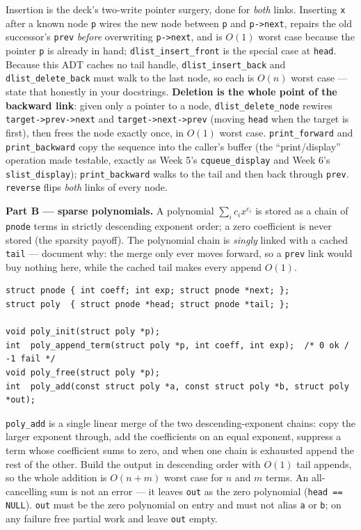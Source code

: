 \documentclass[11pt]{article}
\begin{document}
Insertion is the deck's two-write pointer surgery, done for \emph{both} links. Inserting \texttt{x} after a known node \texttt{p} wires the new node between \texttt{p} and \texttt{p->next}, repairs the old successor's \texttt{prev} \emph{before} overwriting \texttt{p->next}, and is $O(1)$ worst case because the pointer \texttt{p} is already in hand; \texttt{dlist\_insert\_front} is the special case at \texttt{head}. Because this ADT caches no tail handle, \texttt{dlist\_insert\_back} and \texttt{dlist\_delete\_back} must walk to the last node, so each is $O(n)$ worst case --- state that honestly in your docstrings. \textbf{Deletion is the whole point of the backward link}: given only a pointer to a node, \texttt{dlist\_delete\_node} rewires \texttt{target->prev->next} and \texttt{target->next->prev} (moving \texttt{head} when the target is first), then frees the node exactly once, in $O(1)$ worst case. \texttt{print\_forward} and \texttt{print\_backward} copy the sequence into the caller's buffer (the ``print/display'' operation made testable, exactly as Week 5's \texttt{cqueue\_display} and Week 6's \texttt{slist\_display}); \texttt{print\_backward} walks to the tail and then back through \texttt{prev}. \texttt{reverse} flips \emph{both} links of every node.

\textbf{Part B --- sparse polynomials.} A polynomial $\sum_i c_i x^{e_i}$ is stored as a chain of \texttt{pnode} terms in strictly descending exponent order; a zero coefficient is never stored (the sparsity payoff). The polynomial chain is \emph{singly} linked with a cached \texttt{tail} --- document why: the merge only ever moves forward, so a \texttt{prev} link would buy nothing here, while the cached tail makes every append $O(1)$.
\begin{verbatim}
struct pnode { int coeff; int exp; struct pnode *next; };
struct poly  { struct pnode *head; struct pnode *tail; };

void poly_init(struct poly *p);
int  poly_append_term(struct poly *p, int coeff, int exp);  /* 0 ok / -1 fail */
void poly_free(struct poly *p);
int  poly_add(const struct poly *a, const struct poly *b, struct poly *out);
\end{verbatim}

\texttt{poly\_add} is a single linear merge of the two descending-exponent chains: copy the larger exponent through, add the coefficients on an equal exponent, suppress a term whose coefficient sums to zero, and when one chain is exhausted append the rest of the other. Build the output in descending order with $O(1)$ tail appends, so the whole addition is $O(n+m)$ worst case for $n$ and $m$ terms. An all-cancelling sum is not an error --- it leaves \texttt{out} as the zero polynomial (\texttt{head == NULL}). \texttt{out} must be the zero polynomial on entry and must not alias \texttt{a} or \texttt{b}; on any failure free partial work and leave \texttt{out} empty.
\end{document}
